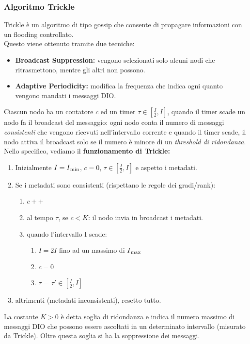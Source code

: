 \documentclass{article}
\begin{document}
\subsubsection{Algoritmo Trickle}
Trickle è un algoritmo di tipo gossip che consente di propagare informazioni con un flooding controllato. \\ Questo viene ottenuto tramite due tecniche:
\begin{itemize}
    \item \textbf{Broadcast Suppression:} vengono selezionati solo alcuni nodi che ritrasmettono, mentre gli altri non possono.
    \item \textbf{Adaptive Periodicity:} modifica la frequenza che indica ogni quanto vengono mandati i messaggi DIO.
\end{itemize}
Ciascun nodo ha un contatore \(\displaystyle c\) ed un timer \(\displaystyle\tau \in [\frac{I}{2}, I]\), quando il timer scade un nodo fa il broadcast del messaggio: ogni nodo conta il numero di messaggi \textit{consistenti} che vengono ricevuti nell'intervallo corrente e quando il timer scade, il nodo attiva il broadcast solo se il numero è minore di un \textit{threshold di ridondanza}. \\ Nello specifico, vediamo il \textbf{funzionamento di Trickle:}
\begin{enumerate}
    \item Inizialmente \(\displaystyle I = I\textsubscript{min}\), \(c=0\), \(\displaystyle\tau \in [\frac{I}{2}, I]\) e aspetto i metadati.
    \item Se i metadati sono consistenti (rispettano le regole dei gradi/rank):
    \begin{enumerate}
        \item \(\displaystyle c++\)
        \item al tempo \(\tau\), se \(c < K\): il nodo invia in broadcast i metadati.
        \item quando l'intervallo I scade:
        \begin{enumerate}
            \item \(\displaystyle I = 2I\) fino ad un massimo di \(\displaystyle I\textsubscript{max}\)
            \item \(\displaystyle c=0\)
            \item \(\displaystyle \tau\) = \(\displaystyle \tau' \in [\frac{I}{2}, I]\)
        \end{enumerate}
    \end{enumerate}
    \item altrimenti (metadati inconsistenti), resetto tutto.
\end{enumerate}
La costante \(K>0\) è detta soglia di ridondanza e indica il numero massimo di messaggi DIO che possono essere ascoltati in un determinato intervallo (misurato da Trickle). Oltre questa soglia si ha la soppressione dei messaggi. \\
\end{document}
